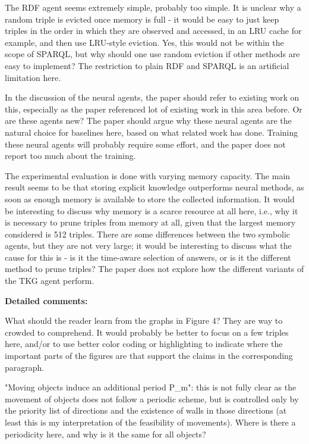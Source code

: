 \documentclass[runningheads]{llncs}
\begin{document}
The RDF agent seems extremely simple, probably too simple. It is unclear why a random triple is evicted once memory is full - it would be easy to just keep triples in the order in which they are observed and accessed, in an LRU cache for example, and then use LRU-style eviction. Yes, this would not be within the scope of SPARQL, but why should one use random eviction if other methods are easy to implement? The restriction to plain RDF and SPARQL is an artificial limitation here.

In the discussion of the neural agents, the paper should refer to existing work on this, especially as the paper referenced lot of existing work in this area before. Or are these agents new? The paper should argue why these neural agents are the natural choice for baselines here, based on what related work has done. Training these neural agents will probably require some effort, and the paper does not report too much about the training.

The experimental evaluation is done with varying memory capacity. The main result seems to be that storing explicit knowledge outperforms neural methods, as soon as enough memory is available to store the collected information. It would be interesting to discuss why memory is a scarce resource at all here, i.e., why it is necessary to prune triples from memory at all, given that the largest memory considered is 512 triples. There are some differences between the two symbolic agents, but they are not very large; it would be interesting to discuss what the cause for this is - is it the time-aware selection of answers, or is it the different method to prune triples? The paper does not explore how the different variants of the TKG agent perform.

\textbf{Detailed comments:}

What should the reader learn from the graphs in Figure 4? They are way to crowded to comprehend. It would probably be better to focus on a few triples here, and/or to use better color coding or highlighting to indicate where the important parts of the figures are that support the claims in the corresponding paragraph.

"Moving objects induce an additional period P\_m": this is not fully clear as the movement of objects does not follow a periodic scheme, but is controlled only by the priority list of directions and the existence of walls in those directions (at least this is my interpretation of the feasibility of movements). Where is there a periodicity here, and why is it the same for all objects?\\
\end{document}
